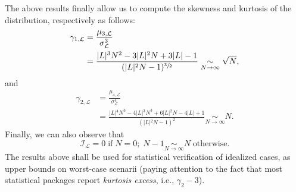 The above results finally allow us to compute the skewness and
kurtosis of the distribution, respectively as follows:
\begin{align*}
\gamma_{1,\mathcal{L}}
&= \frac{\mu_{3,\mathcal{L}}}{\sigma_{\mathcal{L}}^3}\\
&= \frac{\vert{L}\vert{}^3N^2-3\vert{L}\vert{}^2N+3\vert{L}\vert{}-1}
{(\vert{L}\vert{}^2N-1)^{\sfrac{3}{2}}}
\underset{N\to\infty}{\sim}\sqrt{N},
\end{align*}
and
\begin{align*}
\gamma_{2,\mathcal{L}}
&= \frac{\mu_{4,\mathcal{L}}}{\sigma_{\mathcal{L}}^4}\\
&= \frac{\vert{L}\vert{}^4N^3 - 4\vert{L}\vert{}^3N^3
+ 6\vert{L}\vert{}^2N - 4\vert{L}\vert{} + 1}
{(\vert{L}\vert{}^2N-1)^2}
\underset{N\to\infty}{\sim}N.
\end{align*}
Finally, we can also observe that
\[
\mathcal{I}_{\mathcal{L}}
= 0 \;\mathrm{if}\;N=0;\;N-1\underset{N\to\infty}{\sim}N\;\mathrm{otherwise}.
\]
The results above shall be used for statistical verification of
idealized cases, as upper bounds on worst-case scenarii (paying
attention to the fact that most statistical packages report
\emph{kurtosis excess}, i.e., $\gamma_2-3$).

